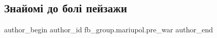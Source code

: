  
 
 
 
 

\subsection{Знайомі до болі пейзажи}
\label{sec:04_02_2023.fb.fb_group.mariupol.pre_war.6.znaiom__do_bol__peiz}

\ifcmt
 author_begin
   author_id fb_group.mariupol.pre_war
 author_end
\fi
